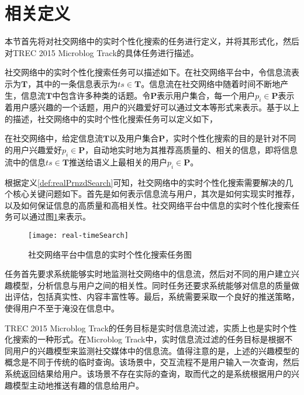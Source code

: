 \section{相关定义}
\label{sec2:definition}
本节首先将对社交网络中的实时个性化搜索的任务进行定义，并将其形式化，然后对TREC 2015 Microblog Track的具体任务进行描述。

社交网络中的实时个性化搜索任务可以描述如下。在社交网络平台中，令信息流表示为$\mathbf{T}$，其中的一条信息表示为$ts \in \mathbf{T}$。信息流在社交网络中随着时间不断地产生，信息流$\mathbf{T}$中包含许多种类的话题。令$\mathbf{P}$表示用户集合，每一个用户$p_i \in \mathbf{P}$表示着用户感兴趣的一个话题，用户的兴趣爱好可以通过文本等形式来表示。基于以上的描述，社交网络中的实时个性化搜索任务可以定义如下，
\begin{defn}[实时个性化搜索]\label{def:realPrnzdSearch}
在社交网络中，给定信息流$\mathbf{T}$以及用户集合$\mathbf{P}$，实时个性化搜索的目的是针对不同的用户兴趣爱好$p_i \in \mathbf{P}$，自动地实时地为其推荐高质量的、相关的信息，即将信息流中的信息$ts \in \mathbf{T}$推送给语义上最相关的用户$p_i \in \mathbf{P}$。
\end{defn}

根据定义\ref{def:realPrnzdSearch}可知，社交网络中的实时个性化搜索需要解决的几个核心关键问题如下。首先是如何表示信息流与用户，其次是如何实现实时推荐，以及如何保证信息的高质量和高相关性。社交网络平台中信息的实时个性化搜索任务可以通过图\ref{fig:real-timeSearch}来表示。
\begin{figure}[!htbp] %
  \centering
  \texttt{[image: real-timeSearch]}
  \caption{社交网络平台中信息的实时个性化搜索任务图}
  \label{fig:real-timeSearch}
\end{figure}

任务首先要求系统能够实时地监测社交网络中的信息流，然后对不同的用户建立兴趣模型，分析信息与用户之间的相关性。同时任务还要求系统能够对信息的质量做出评估，包括真实性、内容丰富性等。最后，系统需要采取一个良好的推送策略，使得用户不至于淹没在信息中。

TREC 2015 Microblog Track的任务目标是实时信息流过滤，实质上也是实时个性化搜索的一种形式。在Microblog Track中，实时信息流过滤的任务目标是根据不同用户的兴趣模型来监测社交媒体中的信息流。值得注意的是，上述的兴趣模型的概念是不同于传统的临时查询。该场景中，交互流程不是用户输入一次查询，然后系统返回结果给用户。该场景不存在实际的查询，取而代之的是系统根据用户的兴趣模型主动地推送有趣的信息给用户。


